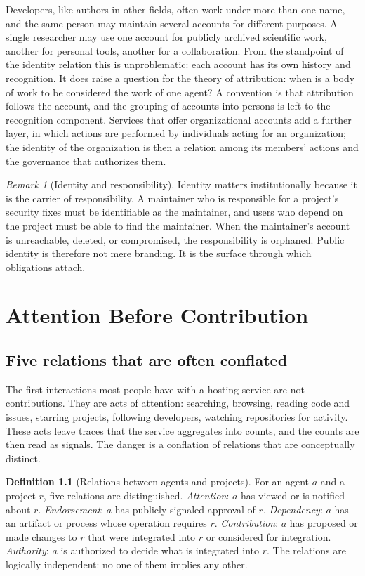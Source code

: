 \documentclass[11pt,twoside,openright]{book}
\theoremstyle{plain}
\theoremstyle{definition}
\newtheorem{definition}[theorem]{Definition}
\theoremstyle{remark}
\newtheorem{remark}[theorem]{Remark}
\begin{document}
Developers, like authors in other fields, often work under more than one name, and the same person may maintain several accounts for different purposes. A single researcher may use one account for publicly archived scientific work, another for personal tools, another for a collaboration. From the standpoint of the identity relation this is unproblematic: each account has its own history and recognition. It does raise a question for the theory of attribution: when is a body of work to be considered the work of one agent? A convention is that attribution follows the account, and the grouping of accounts into persons is left to the recognition component. Services that offer organizational accounts add a further layer, in which actions are performed by individuals acting for an organization; the identity of the organization is then a relation among its members' actions and the governance that authorizes them.

\begin{remark}[Identity and responsibility]
Identity matters institutionally because it is the carrier of responsibility. A maintainer who is responsible for a project's security fixes must be identifiable as the maintainer, and users who depend on the project must be able to find the maintainer. When the maintainer's account is unreachable, deleted, or compromised, the responsibility is orphaned. Public identity is therefore not mere branding. It is the surface through which obligations attach.
\end{remark}

\chapter{Attention Before Contribution}\label{ch:attention}

\section{Five relations that are often conflated}

The first interactions most people have with a hosting service are not contributions. They are acts of attention: searching, browsing, reading code and issues, starring projects, following developers, watching repositories for activity. These acts leave traces that the service aggregates into counts, and the counts are then read as signals. The danger is a conflation of relations that are conceptually distinct.

\begin{definition}[Relations between agents and projects]\label{def:fiverel}
For an agent $a$ and a project $r$, five relations are distinguished.
\emph{Attention}: $a$ has viewed or is notified about $r$.
\emph{Endorsement}: $a$ has publicly signaled approval of $r$.
\emph{Dependency}: $a$ has an artifact or process whose operation requires $r$.
\emph{Contribution}: $a$ has proposed or made changes to $r$ that were integrated into $r$ or considered for integration.
\emph{Authority}: $a$ is authorized to decide what is integrated into $r$.
The relations are logically independent: no one of them implies any other.
\end{definition}
\end{document}
